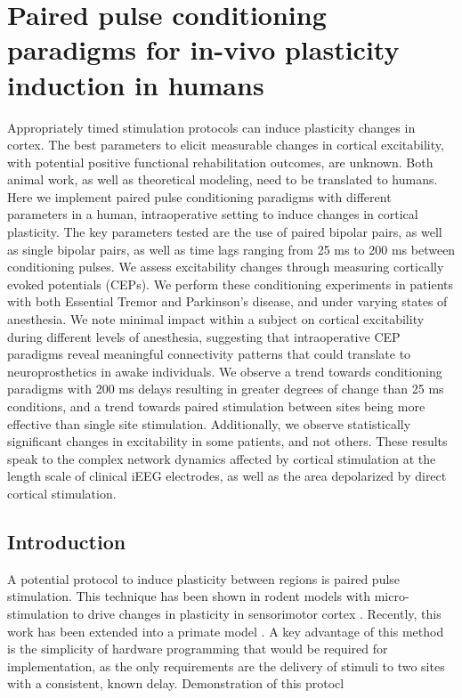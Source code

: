  
 
\chapter {Paired pulse conditioning paradigms for in-vivo plasticity induction in humans}


Appropriately timed stimulation protocols can induce plasticity changes in cortex. The best parameters to elicit measurable changes in cortical excitability, with potential positive functional rehabilitation outcomes, are unknown. Both animal work, as well as theoretical modeling, need to be translated to humans. Here we implement paired pulse conditioning paradigms with different parameters in a human, intraoperative setting to induce changes in cortical plasticity. The key parameters tested are the use of paired bipolar pairs, as well as single bipolar pairs, as well as time lags ranging from 25 ms to 200 ms between conditioning pulses. We assess excitability changes through measuring cortically evoked potentials (CEPs). We perform these conditioning experiments in patients with both Essential Tremor and Parkinson’s disease, and under varying states of anesthesia. We note minimal impact within a subject on cortical excitability during different levels of anesthesia, suggesting that intraoperative CEP paradigms reveal meaningful connectivity patterns that could translate to neuroprosthetics in awake individuals. We observe a trend towards conditioning paradigms with 200 ms delays resulting in greater degrees of change than 25 ms conditions, and a trend towards paired stimulation between sites being more effective than single site stimulation. Additionally, we observe statistically significant changes in excitability in some patients, and not others. These results speak to the complex network dynamics affected by cortical stimulation at the length scale of clinical iEEG electrodes, as well as the area depolarized by direct cortical stimulation. 

\section{Introduction}

A potential protocol to induce plasticity between regions is paired pulse stimulation. This technique has been shown in rodent models with micro-stimulation to drive changes in plasticity in sensorimotor cortex \cite{Rebesco2010}. Recently, this work has been extended into a primate model \cite{Seeman2017}. A key advantage of this method is the simplicity of hardware programming that would be required for implementation, as the only requirements are the delivery of stimuli to two sites with a consistent, known delay. Demonstration of this protocl 


